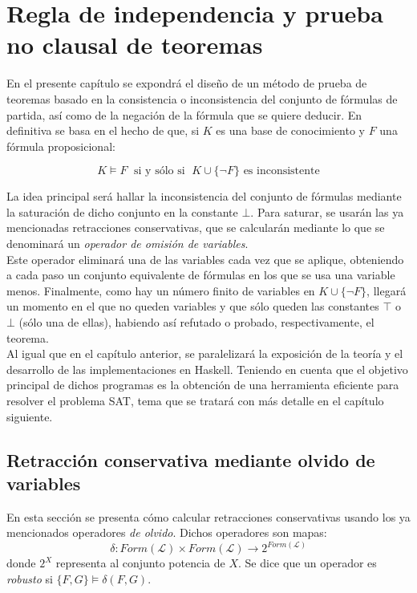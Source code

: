 \chapter{Regla de independencia y prueba no clausal de teoremas}

En el presente capítulo se expondrá el diseño de un método de prueba de teoremas basado en la consistencia o inconsistencia del conjunto de fórmulas de partida, así como de la negación de la fórmula que se quiere deducir. En definitiva se basa en el hecho de que, si $K$ es una base de conocimiento y $F$ una fórmula proposicional:

$$K\vDash F \;\text{ si y sólo si }\; K \cup \{ \neg F \} \text{ es inconsistente}$$

La idea principal será hallar la inconsistencia del conjunto de fórmulas mediante la saturación de dicho conjunto en la constante $\bot$. Para saturar, se usarán las ya mencionadas retracciones conservativas,  que se calcularán mediante lo que se denominará un \textit{operador de omisión de variables}. \\

Este operador eliminará una de las variables cada vez que se aplique, obteniendo a cada paso un conjunto equivalente de fórmulas en los que se usa una variable menos. Finalmente, como hay un número finito de variables en $K \cup \{ \neg F \} $, llegará un momento en el que no queden variables y que sólo queden las constantes $\top$ o $\bot$ (sólo una de ellas), habiendo así refutado o probado, respectivamente, el teorema.\\

Al igual que en el capítulo anterior, se paralelizará la exposición de la teoría y el desarrollo de las implementaciones en Haskell. Teniendo en cuenta que el objetivo principal de dichos programas es la obtención de una herramienta eficiente para resolver el problema SAT, tema que se tratará con más detalle en el capítulo siguiente.

\section{Retracción conservativa mediante olvido de variables}
En esta sección se presenta cómo calcular retracciones conservativas usando los ya mencionados operadores \textit{de olvido}. Dichos operadores son mapas:
$$\delta : Form(\mathcal{L}) \times Form(\mathcal{L}) \longrightarrow 2^{Form(\mathcal{L})} $$
donde $2^X$ representa al conjunto potencia de $X$. Se dice que un operador es \textit{robusto} si $\{F,G\} \vDash \delta (F,G)$.


